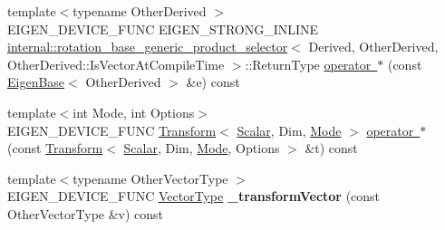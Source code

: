 \begin{DoxyCompactItemize}
\item 
{\footnotesize template$<$typename Other\+Derived $>$ }\\E\+I\+G\+E\+N\+\_\+\+D\+E\+V\+I\+C\+E\+\_\+\+F\+U\+NC E\+I\+G\+E\+N\+\_\+\+S\+T\+R\+O\+N\+G\+\_\+\+I\+N\+L\+I\+NE \mbox{\hyperlink{struct_eigen_1_1internal_1_1rotation__base__generic__product__selector}{internal\+::rotation\+\_\+base\+\_\+generic\+\_\+product\+\_\+selector}}$<$ Derived, Other\+Derived, Other\+Derived\+::\+Is\+Vector\+At\+Compile\+Time $>$\+::Return\+Type \mbox{\hyperlink{class_eigen_1_1_rotation_base_a0b0ca4567df86abd5762e72f7c02ca9c}{operator $\ast$}} (const \mbox{\hyperlink{struct_eigen_1_1_eigen_base}{Eigen\+Base}}$<$ Other\+Derived $>$ \&e) const
\item 
{\footnotesize template$<$int Mode, int Options$>$ }\\E\+I\+G\+E\+N\+\_\+\+D\+E\+V\+I\+C\+E\+\_\+\+F\+U\+NC \mbox{\hyperlink{class_eigen_1_1_transform}{Transform}}$<$ \mbox{\hyperlink{class_eigen_1_1_rotation_base_af9b43eac462d7aa70b018efd49c13ef4}{Scalar}}, Dim, \mbox{\hyperlink{struct_mode}{Mode}} $>$ \mbox{\hyperlink{class_eigen_1_1_rotation_base_af7d001398ec8522f6cf3066a7e2d2d93}{operator $\ast$}} (const \mbox{\hyperlink{class_eigen_1_1_transform}{Transform}}$<$ \mbox{\hyperlink{class_eigen_1_1_rotation_base_af9b43eac462d7aa70b018efd49c13ef4}{Scalar}}, Dim, \mbox{\hyperlink{struct_mode}{Mode}}, Options $>$ \&t) const
\item 
\mbox{\label{class_eigen_1_1_rotation_base_a015ba3b47831570ec525f22b79253bbe}} 
{\footnotesize template$<$typename Other\+Vector\+Type $>$ }\\E\+I\+G\+E\+N\+\_\+\+D\+E\+V\+I\+C\+E\+\_\+\+F\+U\+NC \mbox{\hyperlink{class_eigen_1_1_matrix}{Vector\+Type}} {\bfseries \+\_\+transform\+Vector} (const Other\+Vector\+Type \&v) const
\end{DoxyCompactItemize}
